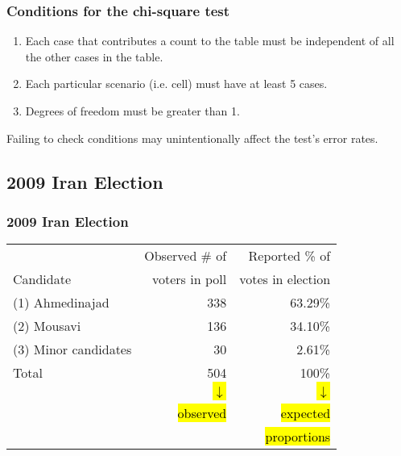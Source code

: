 \documentclass[slidestop,compress,mathserif]{beamer}
\begin{document}

\begin{frame}
\frametitle{Conditions for the chi-square test}

\begin{enumerate}

\item {} Each case that contributes a count to the table must be independent of all the other cases in the table.

\pause

\item {} Each particular scenario (i.e. cell) must have at least 5  cases.

\pause

\item {} Degrees of freedom must be greater than 1.

\end{enumerate}

\pause

Failing to check conditions may unintentionally affect the test's error rates.

\end{frame}


\subsection{2009 Iran Election}


\begin{frame}
\frametitle{2009 Iran Election}


\begin{center}
\begin{tabular}{l | r r}
					& \footnotesize{Observed \# of} & \footnotesize{Reported \% of} \\
\footnotesize{Candidate}	& \footnotesize{voters in poll} & \footnotesize{votes in election} \\
\hline
(1) Ahmedinajad	& 338	& 63.29\% \\
(2) Mousavi		& 136	& 34.10\% \\
(3) Minor candidates	& 30	& 2.61\% \\
\hline
Total			& 504	& 100\% \\
\pause
			& \hl{$\downarrow$}	& \hl{$\downarrow$}	\\
			& \hl{observed}	& \hl{expected} \\
			& 			& \hl{proportions} 	
\end{tabular}
\end{center}

\end{frame}
\end{document}
